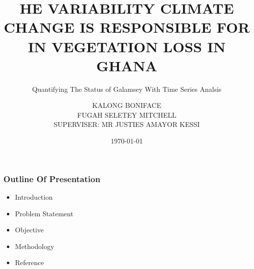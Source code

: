 \documentclass[11pt]{beamer}
\begin{document}
	\author[Group Nine]{KALONG BONIFACE \\
		   FUGAH SELETEY MITCHELL\\
		  			  SUPERVISER: MR JUSTIES AMAYOR KESSI	}  
\title[Proposal]{HE VARIABILITY CLIMATE CHANGE IS RESPONSIBLE FOR IN VEGETATION LOSS IN GHANA}
	\subtitle{Quantifying The Status of Galamsey With Time Series Analsis}
	\date{\today}
	\begin{frame}
		\maketitle
	\end{frame}
	\begin{frame}
		\frametitle{Outline Of Presentation}
		\begin{itemize}
			\item Introduction
			\item Problem Statement
			\item Objective
			\item Methodology
			\item Reference
		\end{itemize}
	\end{frame}
\end{document}
